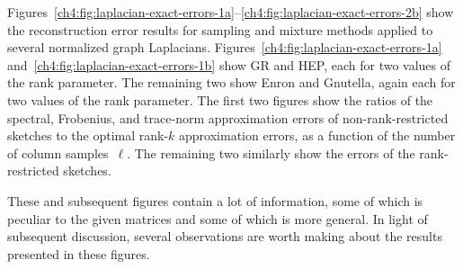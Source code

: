 Figures~\ref{ch4:fig:laplacian-exact-errors-1a}--\ref{ch4:fig:laplacian-exact-errors-2b} 
show the reconstruction error results for sampling and mixture methods 
applied to several normalized graph Laplacians.
Figures~\ref{ch4:fig:laplacian-exact-errors-1a} and~\ref{ch4:fig:laplacian-exact-errors-1b} 
show GR and HEP, each for two values of the rank parameter. The remaining two show
Enron and Gnutella, again each for two values of the 
rank parameter.
The first two figures show the ratios of the spectral, Frobenius, and trace-norm approximation 
errors of non-rank-restricted sketches to the optimal rank-$k$ 
approximation errors, as a function of the number of column samples~$\ell.$
The remaining two similarly show the errors of the rank-restricted sketches.

These and subsequent figures contain a lot of information, some of which is
peculiar to the given matrices and some of which is more general.
In light of subsequent discussion, several observations are worth making 
about the results presented in these figures.
